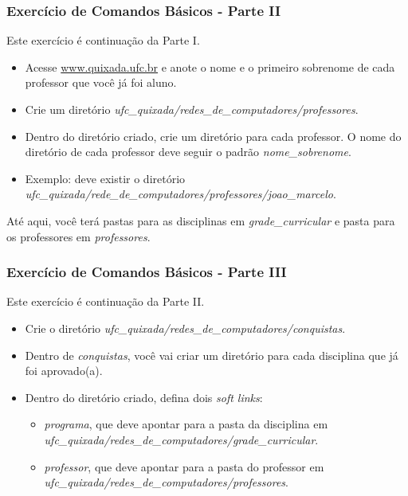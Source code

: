 \documentclass{beamer}
\begin{document}
   \begin{frame}
      \frametitle{Exercício de Comandos Básicos - Parte II}
      Este exercício é continuação da Parte I.
      \begin{itemize}
         \item Acesse \url{www.quixada.ufc.br} e anote o nome e o primeiro sobrenome de cada professor que você já foi aluno.
         \item Crie um diretório \textit{ufc\_quixada/redes\_de\_computadores/professores}.
         \item Dentro do diretório criado, crie um diretório para cada professor. O nome do diretório de cada professor deve seguir o padrão \textit{nome\_sobrenome}. 
         \item Exemplo: deve existir o diretório \textit{ufc\_quixada/rede\_de\_computadores/professores/joao\_marcelo}.
      \end{itemize}
      Até aqui, você terá pastas para as disciplinas em \textit{grade\_curricular} e pasta para os professores em \textit{professores}.
   \end{frame}

   \begin{frame}
      \frametitle{Exercício de Comandos Básicos - Parte III}
      Este exercício é continuação da Parte II.
      \begin{itemize}
         \item Crie o diretório \textit{ufc\_quixada/redes\_de\_computadores/conquistas}.
	      \item Dentro de \textit{conquistas}, você vai criar um diretório para cada disciplina que já foi aprovado(a).
         \item Dentro do diretório criado, defina dois \textit{soft links}:
	      \begin{itemize}
	         \item \textit{programa}, que deve apontar para a pasta da disciplina em \textit{ufc\_quixada/redes\_de\_computadores/grade\_curricular}.
	         \item \textit{professor}, que deve apontar para a pasta do professor em \textit{ufc\_quixada/redes\_de\_computadores/professores}.
	      \end{itemize}
      \end{itemize}
   \end{frame}
\end{document}
